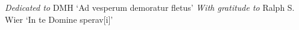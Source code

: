 \clearpage
\begin{center}
    \thispagestyle{empty}
    \vspace*{\fill}
    \emph{Dedicated to}\newline
    DMH\newline
    \vspace*{5mm}
    `Ad vesperum demoratur fletus'\newline
    \vspace*{30mm}
    \emph{With gratitude to}\newline
    Ralph S. Wier\newline
    \vspace*{5mm}
    `In te Domine sperav[i]'
    \vspace*{\fill}
\end{center}
\clearpage
{}
